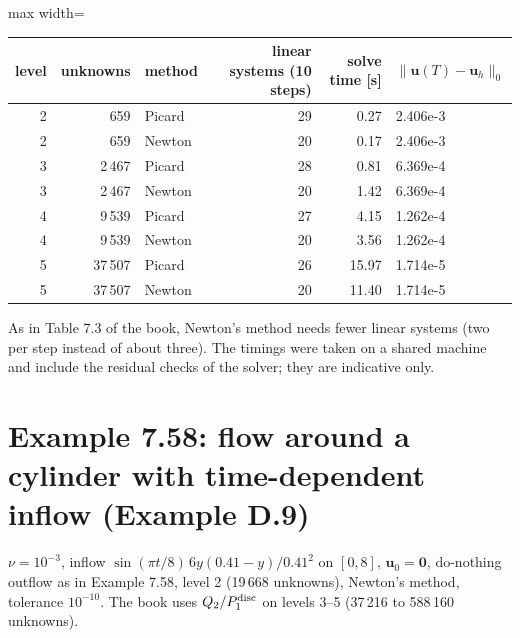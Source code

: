 \documentclass[11pt,a4paper]{article}
\newcommand{\bu}{\boldsymbol{u}}
\begin{document}
\begin{center}\begin{adjustbox}{max width=\textwidth}
\begin{tabular}{rrlrrl}
\toprule
level & unknowns & method & linear systems (10 steps) & solve time [s] & $\|\bu(T)-\bu_h\|_0$\\
\midrule
2 & 659 & Picard & 29 & 0.27 & 2.406e-3\\
2 & 659 & Newton & 20 & 0.17 & 2.406e-3\\
3 & 2\,467 & Picard & 28 & 0.81 & 6.369e-4\\
3 & 2\,467 & Newton & 20 & 1.42 & 6.369e-4\\
4 & 9\,539 & Picard & 27 & 4.15 & 1.262e-4\\
4 & 9\,539 & Newton & 20 & 3.56 & 1.262e-4\\
5 & 37\,507 & Picard & 26 & 15.97 & 1.714e-5\\
5 & 37\,507 & Newton & 20 & 11.40 & 1.714e-5\\
\bottomrule
\end{tabular}
\end{adjustbox}\end{center}
As in Table 7.3 of the book, Newton's method needs fewer linear systems (two per step instead of about three). The
timings were taken on a shared machine and include the residual checks of the solver; they are indicative only.

\section{Example 7.58: flow around a cylinder with time-dependent inflow (Example D.9)}

$\nu=10^{-3}$, inflow $\sin(\pi t/8)\,6y(0.41-y)/0.41^2$ on $[0,8]$, $\bu_0=\boldsymbol0$, do-nothing outflow as in
Example 7.58, level 2 (19\,668 unknowns), Newton's method, tolerance $10^{-10}$. The book uses $Q_2/P_1^{\rm disc}$ on
levels 3--5 (37\,216 to 588\,160 unknowns).
\end{document}
